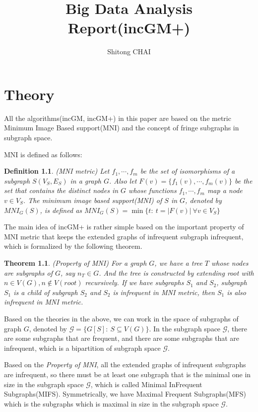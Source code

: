 \documentclass[a4paper, 12pt]{report}
\title{Big Data Analysis Report(incGM+)}
\date{}
\author{Shitong CHAI}
\newtheorem{theorem}{Theorem}[chapter]
\newtheorem{definition}{Definition}[chapter]
\begin{document}
\maketitle
\tableofcontents

\chapter {Theory}
All the algorithms(incGM, incGM+) in this paper\cite{incGM} are based on the metric Minimum Image Based support(MNI)\cite{mni} and the concept of fringe subgraphs in subgraph space.

MNI is defined as follows:
\begin{definition}
    (MNI metric\cite{grami}) Let $f_1,\cdots,f_m$ be the set of isomorphisms of a subgraph $S(V_S,E_S)$ in a graph $G$. Also let $F(v)=\{f_1(v),\cdots,f_m(v)\}$ be the set that contains the distinct nodes in $G$ whose functions $f_1,\cdots,f_m$ map a node $v\in V_S$. The minimum image based support(MNI) of $S$ in $G$, denoted by $MNI_G(S)$, is defined as $MNI_G(S)=\min\{t:\ t=|F(v)|\ \forall v\in V_S\}$
\end{definition}

The main idea of incGM+ is rather simple based on the important property of MNI metric that keeps the extended graphs of infrequent subgraph infrequent, which is formalized by the following theorem.
\begin{theorem}
    (Property of MNI\cite{grami}) For a graph $G$, we have a tree $T$  whose nodes are subgraphs of $G$, say $n_T\in G$. And the tree is constructed by extending root with $n\in V(G), n\notin V(root)$ recursively. If we have subgraphs $S_1$ and $S_2$, subgraph $S_1$ is a child of subgraph $S_2$ and $S_2$ is infrequent in MNI metric, then $S_1$ is also infrequent in MNI metric.
\end{theorem}
Based on the theories in the above, we can work in the space of subgraphs of graph $G$, denoted by $\mathscr{G}=\{G[S]:\ S\subseteq V(G)\}$. In the subgraph space $\mathscr G$, there are some subgraphs that are frequent, and there are some subgraphs that are infrequent, which is a bipartition of subgraph space $\mathscr{G}$. 

Based on the \emph{Property of MNI}, all the extended graphs of infrequent subgraphs are infrequent, so there must be at least one subgraph that is the minimal one in size in the subgraph space $\mathscr{G}$, which is called Minimal InFrequent Subgraphs(MIFS). Symmetrically, we have
Maximal Frequent Subgraphs(MFS) which is the subgraphs which is maximal in size in the subgraph space $\mathscr{G}$.
\end{document}
